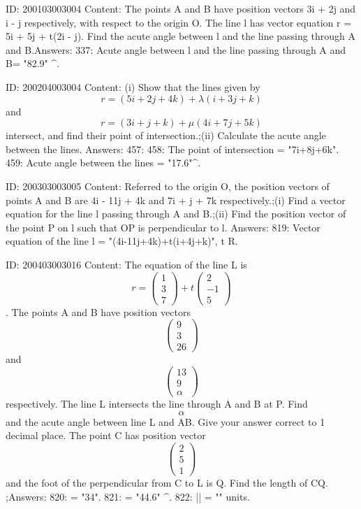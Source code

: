 \documentclass{article}
\begin{document}
ID: 200103003004
Content:
The points A and B have position vectors 3i + 2j and i - j respectively, with respect to the origin O. The line l has vector equation r = 5i + 5j + t(2i - j). Find the acute angle between l and the line passing through A and B.Answers:
337: Acute angle between l and the line passing through A and B= "82.9" ^{\circ}.

ID: 200204003004
Content:
(i) Show that the lines given by  $$r = ( 5i + 2j + 4k ) + \lambda ( i + 3j + k )$$ and  $$r = ( 3i + j + k ) + \mu ( 4i + 7j + 5k )$$ intersect, and find their point of intersection.;(ii) Calculate the acute angle between the lines. Answers:
457: 
458: The point of intersection = "7i+8j+6k".
459: Acute angle between the lines = "17.6"^{\circ}.

ID: 200303003005
Content:
Referred to the origin O, the position vectors of points A and B are 4i - 11j + 4k and 7i + j + 7k respectively.;(i) Find a vector equation for the line l passing through A and B.;(ii) Find the position vector of the point P on l such that OP is perpendicular to l. Answers:
819: Vector equation of the line l = "(4i-11j+4k)+t(i+4j+k)", t \in R.

ID: 200403003016
Content:
The equation of the line L is  $$r =  \begin{pmatrix} 1\\ 3\\ 7 \end{pmatrix} + t \begin{pmatrix} 2\\ -1\\ 5 \end{pmatrix}$$. The points A and B have position vectors  $$ \begin{pmatrix} 9\\ 3\\ 26 \end{pmatrix}$$ and  $$ \begin{pmatrix} 13\\ 9\\ \alpha \end{pmatrix}$$ respectively. The line L intersects the line through A and B at P. Find  $$\alpha $$ and the acute angle between line L and AB. Give your answer correct to 1 decimal place. The point C has position vector  $$ \begin{pmatrix} 2\\ 5\\ 1 \end{pmatrix}$$ and the foot of the perpendicular from C to L is Q. Find the length of CQ. ;Answers:
820: \alpha = "34".
821: \theta = "44.6" ^{\circ}.
822: || = "" units.
\end{document}
